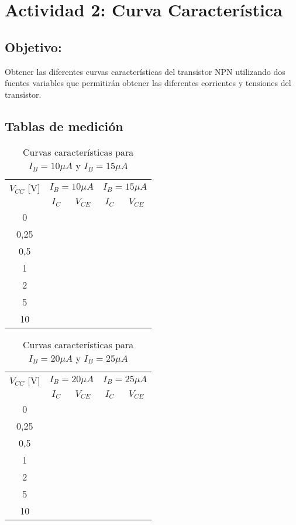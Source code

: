 \section{Actividad 2: Curva Característica}

 \subsection{Objetivo:}
Obtener las diferentes curvas características del transistor NPN utilizando dos
fuentes variables que permitirán obtener las diferentes corrientes y tensiones del transistor.

\subsection{Tablas de medición}

\begin{table}[H]
	\centering
	\begin{tabular}{|c|cc|cc|}
		\hline
		$V_{CC}$ [V] & \multicolumn{2}{c|}{$I_B=10\mu A$} & \multicolumn{2}{c|}{$I_B=15\mu A$} \\
		\cline{2-5}
		 & $I_C$ & $V_{CE}$ & $I_C$ & $V_{CE}$ \\
		\hline
		0    &      &        &      &        \\
		0,25 &      &        &      &        \\
		0,5  &      &        &      &        \\
		1    &      &        &      &        \\
		2    &      &        &      &        \\
		5    &      &        &      &        \\
		10   &      &        &      &        \\
		\hline
	\end{tabular}
	\caption{Curvas características para $I_B=10\mu A$ y $I_B=15\mu A$}
	\label{tab:carac-ib10-ib15}
\end{table}

\begin{table}[H]
	\centering
	\begin{tabular}{|c|cc|cc|}
		\hline
		$V_{CC}$ [V] & \multicolumn{2}{c|}{$I_B=20\mu A$} & \multicolumn{2}{c|}{$I_B=25\mu A$} \\
		\cline{2-5}
		 & $I_C$ & $V_{CE}$ & $I_C$ & $V_{CE}$ \\
		\hline
		0    &      &        &      &        \\
		0,25 &      &        &      &        \\
		0,5  &      &        &      &        \\
		1    &      &        &      &        \\
		2    &      &        &      &        \\
		5    &      &        &      &        \\
		10   &      &        &      &        \\
		\hline
	\end{tabular}
	\caption{Curvas características para $I_B=20\mu A$ y $I_B=25\mu A$}
	\label{tab:carac-ib20-ib25}
\end{table}



